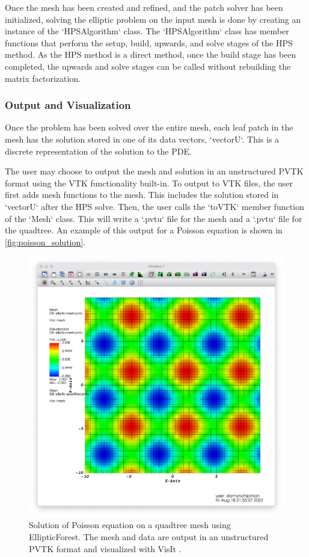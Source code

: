 Once the mesh has been created and refined, and the patch solver has been initialized, solving the elliptic problem on the input mesh is done by creating an instance of the `HPSAlgorithm` class. The `HPSAlgorithm` class has member functions that perform the setup, build, upwards, and solve stages of the HPS method. As the HPS method is a direct method, once the build stage has been completed, the upwards and solve stages can be called without rebuilding the matrix factorization.

\subsubsection{Output and Visualization}

Once the problem has been solved over the entire mesh, each leaf patch in the mesh has the solution stored in one of its data vectors, `vectorU`. This is a discrete representation of the solution to the PDE.

The user may choose to output the mesh and solution in an unstructured PVTK format using the VTK functionality built-in. To output to VTK files, the user first adds mesh functions to the mesh. This includes the solution stored in `vectorU` after the HPS solve. Then, the user calls the `toVTK` member function of the `Mesh` class. This will write a `.pvtu` file for the mesh and a `.pvtu` file for the quadtree. An example of this output for a Poisson equation is shown in \autoref{fig:poisson_solution}.

\begin{figure}
    \centering
    \includegraphics[width=\textwidth, clip=true, trim={0 0 0 0}]{figures/sine_cosine_output.png}
    \caption{Solution of Poisson equation on a quadtree mesh using EllipticForest. The mesh and data are output in an unstructured PVTK format and visualized with VisIt \cite{HPV_VisIt}.}
    \label{fig:poisson_solution}
\end{figure}

